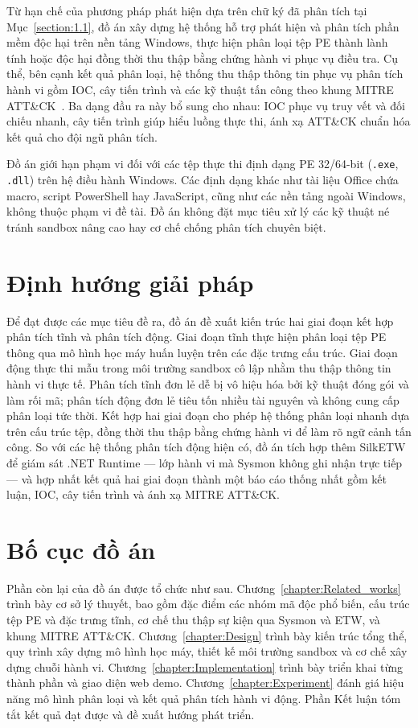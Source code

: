 \documentclass[../DoAn.tex]{subfiles}
\begin{document}
Từ hạn chế của phương pháp phát hiện dựa trên chữ ký đã phân tích tại
Mục~\ref{section:1.1}, đồ án xây dựng hệ thống hỗ trợ phát hiện và
phân tích phần mềm độc hại trên nền tảng Windows, thực hiện phân loại
tệp PE thành lành tính hoặc độc hại đồng thời thu thập bằng chứng hành
vi phục vụ điều tra.
Cụ thể, bên cạnh kết quả phân loại, hệ thống thu thập thông tin phục
vụ phân tích hành vi gồm IOC, cây tiến trình và các
kỹ thuật tấn công theo khung MITRE ATT\&CK~\cite{mitre_attack}. Ba dạng đầu ra này bổ sung
cho nhau: IOC phục vụ truy vết và đối chiếu nhanh, cây tiến trình giúp
hiểu luồng thực thi, ánh xạ ATT\&CK chuẩn hóa kết quả cho đội ngũ
phân tích.

Đồ án giới hạn phạm vi đối với các tệp thực thi định dạng PE 32/64-bit
(\texttt{.exe}, \texttt{.dll}) trên hệ điều hành Windows. Các định dạng
khác như tài liệu Office chứa macro, script PowerShell hay JavaScript,
cũng như các nền tảng ngoài Windows, không thuộc phạm vi đề tài. Đồ
án không đặt mục tiêu xử lý các kỹ thuật né tránh sandbox nâng cao
hay cơ chế chống phân tích chuyên biệt.

\section{Định hướng giải pháp}
\label{section:1.3}

Để đạt được các mục tiêu đề ra, đồ án đề xuất kiến trúc hai giai đoạn
kết hợp phân tích tĩnh và phân tích động. Giai đoạn tĩnh thực hiện
phân loại tệp PE thông qua mô hình học máy huấn luyện trên các đặc
trưng cấu trúc. Giai đoạn động thực thi mẫu trong môi trường sandbox
cô lập nhằm thu thập thông tin hành vi thực tế. Phân tích tĩnh đơn lẻ
dễ bị vô hiệu hóa bởi kỹ thuật đóng gói và làm rối mã; phân tích động
đơn lẻ tiêu tốn nhiều tài nguyên và không cung cấp phân loại tức thời.
Kết hợp hai giai đoạn cho phép hệ thống phân loại nhanh dựa trên cấu
trúc tệp, đồng thời thu thập bằng chứng hành vi để làm rõ ngữ cảnh
tấn công. So với các hệ thống phân tích động hiện có, đồ án tích hợp
thêm SilkETW để giám sát .NET Runtime — lớp hành vi mà Sysmon không
ghi nhận trực tiếp — và hợp nhất kết quả hai giai đoạn thành một báo
cáo thống nhất gồm kết luận, IOC, cây tiến trình và ánh xạ MITRE
ATT\&CK.

\section{Bố cục đồ án}
\label{section:1.4}

Phần còn lại của đồ án được tổ chức như sau.
Chương~\ref{chapter:Related_works} trình bày cơ sở lý thuyết, bao gồm
đặc điểm các nhóm mã độc phổ biến, cấu trúc tệp PE và đặc trưng tĩnh,
cơ chế thu thập sự kiện qua Sysmon và ETW, và khung MITRE ATT\&CK.
Chương~\ref{chapter:Design} trình bày kiến trúc tổng thể, quy trình xây
dựng mô hình học máy, thiết kế môi trường sandbox và cơ chế xây dựng
chuỗi hành vi.
Chương~\ref{chapter:Implementation} trình bày triển khai từng thành phần
và giao diện web demo.
Chương~\ref{chapter:Experiment} đánh giá hiệu năng mô hình phân loại
và kết quả phân tích hành vi động.
Phần Kết luận tóm tắt kết quả đạt được và đề xuất
hướng phát triển.
\end{document}
